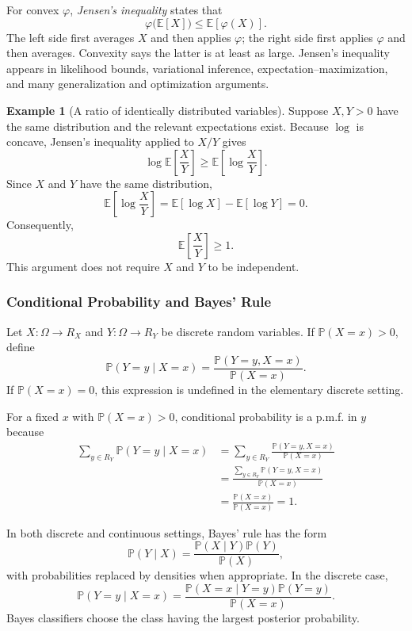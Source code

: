 \documentclass[12pt,oneside]{book}
\numberwithin{equation}{section}
\theoremstyle{definition}
\newtheorem{example}{Example}[section]
\theoremstyle{plain}
\theoremstyle{remark}
\newcommand{\E}{\mathbb{E}}
\begin{document}
For convex $\varphi$, \emph{Jensen's inequality} states that
\[
\varphi\bigl(\E[X]\bigr)\leq\E[\varphi(X)].
\]
The left side first averages $X$ and then applies $\varphi$; the right side first applies $\varphi$ and then averages. Convexity says the latter is at least as large. Jensen's inequality appears in likelihood bounds, variational inference, expectation--maximization, and many generalization and optimization arguments.

\begin{example}[A ratio of identically distributed variables]
Suppose $X,Y>0$ have the same distribution and the relevant expectations exist. Because $\log$ is concave, Jensen's inequality applied to $X/Y$ gives
\[
\log\E\left[\frac{X}{Y}\right]
\geq
\E\left[\log\frac{X}{Y}\right].
\]
Since $X$ and $Y$ have the same distribution,
\[
\E\left[\log\frac{X}{Y}\right]
=\E[\log X]-\E[\log Y]=0.
\]
Consequently,
\[
\E\left[\frac{X}{Y}\right]\geq1.
\]
This argument does not require $X$ and $Y$ to be independent.
\end{example}

\subsubsection{Conditional Probability and Bayes' Rule}
Let $X\colon\Omega\to R_X$ and $Y\colon\Omega\to R_Y$ be discrete random variables. If $\mathbb{P}(X=x)>0$, define
\[
\mathbb{P}(Y=y\mid X=x)
=\frac{\mathbb{P}(Y=y,X=x)}{\mathbb{P}(X=x)}.
\]
If $\mathbb{P}(X=x)=0$, this expression is undefined in the elementary discrete setting.

For a fixed $x$ with $\mathbb{P}(X=x)>0$, conditional probability is a p.m.f. in $y$ because
\begin{align*}
\sum_{y\in R_Y}\mathbb{P}(Y=y\mid X=x)
&=\sum_{y\in R_Y}
\frac{\mathbb{P}(Y=y,X=x)}{\mathbb{P}(X=x)}\\
&=\frac{\sum_{y\in R_Y}\mathbb{P}(Y=y,X=x)}
{\mathbb{P}(X=x)}\\
&=\frac{\mathbb{P}(X=x)}{\mathbb{P}(X=x)}=1.
\end{align*}

In both discrete and continuous settings, Bayes' rule has the form
\[
\mathbb{P}(Y\mid X)
=\frac{\mathbb{P}(X\mid Y)\mathbb{P}(Y)}{\mathbb{P}(X)},
\]
with probabilities replaced by densities when appropriate. In the discrete case,
\[
\mathbb{P}(Y=y\mid X=x)
=\frac{\mathbb{P}(X=x\mid Y=y)\mathbb{P}(Y=y)}
{\mathbb{P}(X=x)}.
\]
Bayes classifiers choose the class having the largest posterior probability.
\end{document}
